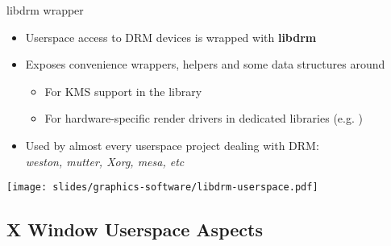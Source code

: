 \begin{frame}{libdrm wrapper}
  \begin{itemize}
  \item Userspace access to DRM devices is wrapped with \textbf{libdrm}
  \item Exposes convenience wrappers, helpers and some data structures around 
    \begin{itemize}
    \item For KMS support in the  library
    \item For hardware-specific render drivers in dedicated libraries (e.g. )
    \end{itemize}
  \item Used by almost every userspace project dealing with DRM:\\
    \textit{weston, mutter, Xorg, mesa, etc}
  \end{itemize}

  \begin{center}
  \texttt{[image: slides/graphics-software/libdrm-userspace.pdf]}
  \end{center}
\end{frame}

\subsection{X Window Userspace Aspects}


